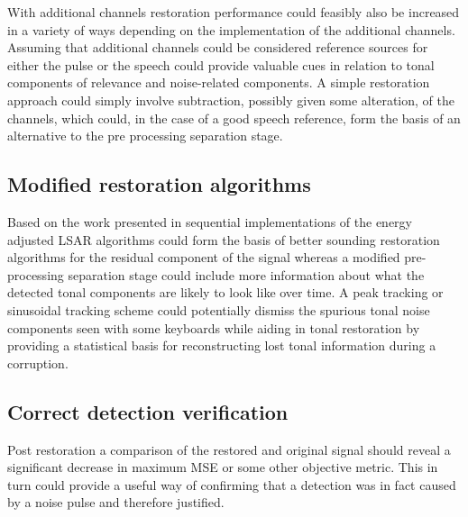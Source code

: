 With additional channels restoration performance could feasibly also be increased in a variety of ways depending on the implementation of the additional channels. Assuming that additional channels could be considered reference sources for either the pulse or the speech could provide valuable cues in relation to tonal components of relevance and noise-related components. A simple restoration approach could simply involve subtraction, possibly given some alteration, of the channels, which could, in the case of a good speech reference, form the basis of an alternative to the pre processing separation stage.

\subsection{Modified restoration algorithms}
Based on the work presented in \cite{Esquef2006} sequential implementations of the energy adjusted LSAR algorithms could form the basis of better sounding restoration algorithms for the residual component of the signal whereas a modified pre-processing separation stage could include more information about what the detected tonal components are likely to look like over time. A peak tracking or sinusoidal tracking scheme\cite{McAulay1986} could potentially dismiss the spurious tonal noise components seen with some keyboards while aiding in tonal restoration by providing a statistical basis for reconstructing lost tonal information during a corruption.

\subsection{Correct detection verification}
Post restoration a comparison of the restored and original signal should reveal a significant decrease in maximum MSE or some other objective metric. This in turn could provide a useful way of confirming that a detection was in fact caused by a noise pulse and therefore justified.

















